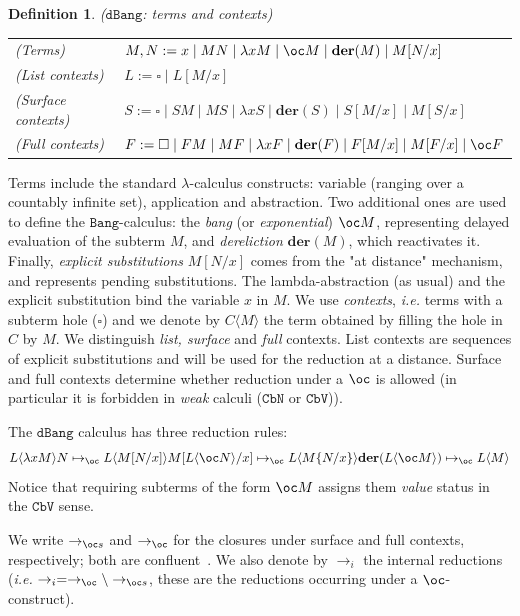 \documentclass[10pt,a4paper]{article}
\newtheorem{definition}[theorem]{Definition}
\newcommand{\<}{\langle}
\renewcommand{\>}{\rangle}
\newcommand{\der}[1]{\ensuremath{\mathbf{der}(#1)}}
\newcommand{\cbn}{\ensuremath{\mathtt{CbN}}}
\newcommand{\cbv}{\ensuremath{\mathtt{CbV}}}
\newcommand{\bang}{\ensuremath{\mathtt{Bang}}}
\newcommand{\dbang}{\ensuremath{\mathtt{dBang}}}
\newcommand{\todb}{\mapsto_{\oc}} %
\newcommand{\todbs}{\to_{\oc s}} %
\newcommand{\todbf}{\to_{\oc}} %
\newcommand{\es}[2]{[#1/#2]}
\begin{document}
\begin{definition}{(\dbang: terms and contexts)}~
	\label{def:dbang-terms-and-ctxs}

	\begin{tabular}{ll}
		(Terms) & $M,N: = x\mid MN\mid \lambda xM \mid \oc M \mid \der M \mid M\es Nx$ \\
		
		(List contexts) & $L:= \square \mid L[M/x]$ \\

		(Surface contexts) & $S:= \square \mid SM \mid MS \mid \lambda x S \mid
		\der S \mid S[M/x] \mid	M\es Sx$\\

		(Full contexts) &  $F:= \square \mid FM \mid MF \mid \lambda x F \mid \der F \mid F\es Mx \mid
		M\es Fx \mid \oc F$ \\

	\end{tabular}
\end{definition}
Terms include the standard $\lambda$-calculus constructs: variable (ranging over a countably infinite set), application and abstraction. Two additional ones are used to define the $\bang{}$-calculus: the \emph{bang} (or \emph{exponential}) $\oc M$,
representing delayed evaluation of the subterm
$M$, and \emph{dereliction} $\der M$, which reactivates it.
Finally, \emph{explicit substitutions} $M \es N x$ comes from the "at distance" mechanism, and represents 
pending substitutions.
The lambda-abstraction (as usual) and the explicit substitution
bind the variable $x$ in $M$. We use \emph{contexts}, \emph{i.e.} terms with a subterm hole
($\square$) and  we denote by $C\langle M \rangle$ the term
obtained by filling the hole in $C$ by $M$. We distinguish \emph{list, surface} and \emph{full} contexts. List
contexts are sequences of explicit substitutions and will be used for the reduction
at a distance. Surface and full contexts determine whether reduction under a
$\oc$ is allowed (in particular it is forbidden in \emph{weak}
calculi (\cbn{} or \cbv{})).

The \dbang{} calculus has three reduction rules: 
\[
L\<\lambda x M\>N \todb L\<M\es Nx\>
\hfill
M\es{L\<\oc N\>}x \todb L\<M\{N/x\}\>
\hfill
\der{L\<\oc M\>} \todb L\<M\>
\]
Notice that requiring subterms of the form $\oc M$ assigns them \emph{value} status in the \cbv{} sense.

We write $\todbs$ and $\todbf$ for the closures under surface and full contexts, respectively; both are confluent~\cite[Theorem 1]{kag24}.
We also denote by $\to_i$ the internal reductions (\emph{i.e.} $\to_i
= \todbf\backslash\todbs$, these are the reductions occurring under a
$\oc$-construct).	
\end{document}

